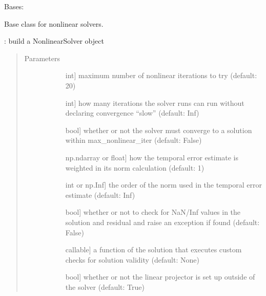 \documentclass[letterpaper,10pt,english]{sphinxmanual}
\begin{document}
\begin{fulllineitems}
\label{\detokenize{spitfire.time.nonlinear:spitfire.time.nonlinear.NonlinearSolver}}
Bases: 

Base class for nonlinear solvers.

: build a NonlinearSolver object
\begin{quote}\begin{description}
\item[{Parameters}] \leavevmode\begin{description}
\item[{}] \leavevmode{[}int{]}
maximum number of nonlinear iterations to try (default: 20)

\item[{}] \leavevmode{[}int{]}
how many iterations the solver runs can run without declaring convergence “slow” (default: Inf)

\item[{}] \leavevmode{[}bool{]}
whether or not the solver must converge to a solution within max\_nonlinear\_iter (default: False)

\item[{}] \leavevmode{[}np.ndarray or float{]}
how the temporal error estimate is weighted in its norm calculation (default: 1)

\item[{}] \leavevmode{[}int or np.Inf{]}
the order of the norm used in the temporal error estimate (default: Inf)

\item[{}] \leavevmode{[}bool{]}
whether or not to check for NaN/Inf values in the solution and residual and raise an exception if found (default: False)

\item[{}] \leavevmode{[}callable{]}
a function of the solution that executes custom checks for solution validity (default: None)

\item[{}] \leavevmode{[}bool{]}
whether or not the linear projector is set up outside of the solver (default: True)


\end{description}
\end{description}
\end{quote}
\end{fulllineitems}
\end{document}
